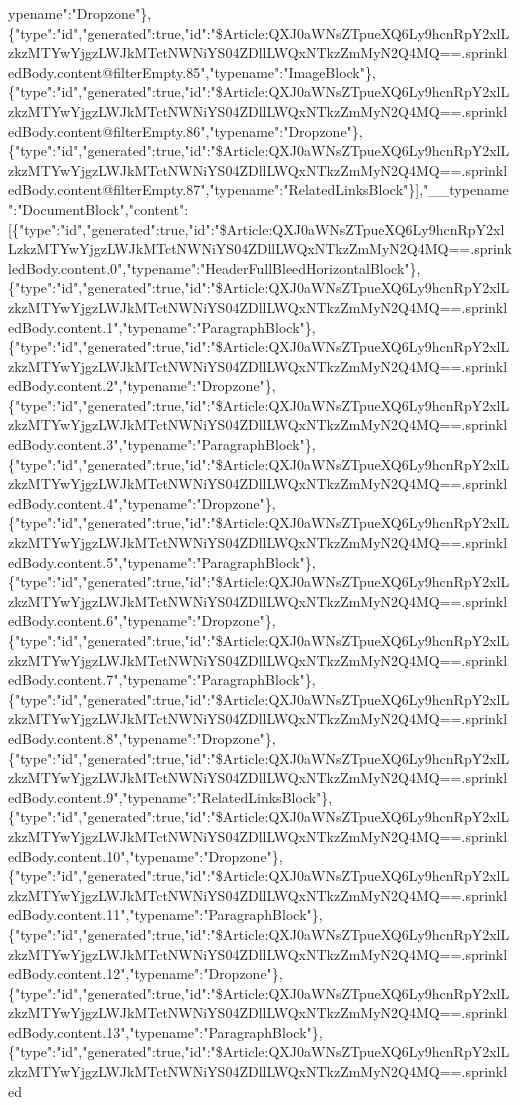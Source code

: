 ypename":"Dropzone"\},\{"type":"id","generated":true,"id":"\$Article:QXJ0aWNsZTpueXQ6Ly9hcnRpY2xlLzkzMTYwYjgzLWJkMTctNWNiYS04ZDllLWQxNTkzZmMyN2Q4MQ==.sprinkledBody.content@filterEmpty.85","typename":"ImageBlock"\},\{"type":"id","generated":true,"id":"\$Article:QXJ0aWNsZTpueXQ6Ly9hcnRpY2xlLzkzMTYwYjgzLWJkMTctNWNiYS04ZDllLWQxNTkzZmMyN2Q4MQ==.sprinkledBody.content@filterEmpty.86","typename":"Dropzone"\},\{"type":"id","generated":true,"id":"\$Article:QXJ0aWNsZTpueXQ6Ly9hcnRpY2xlLzkzMTYwYjgzLWJkMTctNWNiYS04ZDllLWQxNTkzZmMyN2Q4MQ==.sprinkledBody.content@filterEmpty.87","typename":"RelatedLinksBlock"\}{]},"\_\_typename":"DocumentBlock","content":{[}\{"type":"id","generated":true,"id":"\$Article:QXJ0aWNsZTpueXQ6Ly9hcnRpY2xlLzkzMTYwYjgzLWJkMTctNWNiYS04ZDllLWQxNTkzZmMyN2Q4MQ==.sprinkledBody.content.0","typename":"HeaderFullBleedHorizontalBlock"\},\{"type":"id","generated":true,"id":"\$Article:QXJ0aWNsZTpueXQ6Ly9hcnRpY2xlLzkzMTYwYjgzLWJkMTctNWNiYS04ZDllLWQxNTkzZmMyN2Q4MQ==.sprinkledBody.content.1","typename":"ParagraphBlock"\},\{"type":"id","generated":true,"id":"\$Article:QXJ0aWNsZTpueXQ6Ly9hcnRpY2xlLzkzMTYwYjgzLWJkMTctNWNiYS04ZDllLWQxNTkzZmMyN2Q4MQ==.sprinkledBody.content.2","typename":"Dropzone"\},\{"type":"id","generated":true,"id":"\$Article:QXJ0aWNsZTpueXQ6Ly9hcnRpY2xlLzkzMTYwYjgzLWJkMTctNWNiYS04ZDllLWQxNTkzZmMyN2Q4MQ==.sprinkledBody.content.3","typename":"ParagraphBlock"\},\{"type":"id","generated":true,"id":"\$Article:QXJ0aWNsZTpueXQ6Ly9hcnRpY2xlLzkzMTYwYjgzLWJkMTctNWNiYS04ZDllLWQxNTkzZmMyN2Q4MQ==.sprinkledBody.content.4","typename":"Dropzone"\},\{"type":"id","generated":true,"id":"\$Article:QXJ0aWNsZTpueXQ6Ly9hcnRpY2xlLzkzMTYwYjgzLWJkMTctNWNiYS04ZDllLWQxNTkzZmMyN2Q4MQ==.sprinkledBody.content.5","typename":"ParagraphBlock"\},\{"type":"id","generated":true,"id":"\$Article:QXJ0aWNsZTpueXQ6Ly9hcnRpY2xlLzkzMTYwYjgzLWJkMTctNWNiYS04ZDllLWQxNTkzZmMyN2Q4MQ==.sprinkledBody.content.6","typename":"Dropzone"\},\{"type":"id","generated":true,"id":"\$Article:QXJ0aWNsZTpueXQ6Ly9hcnRpY2xlLzkzMTYwYjgzLWJkMTctNWNiYS04ZDllLWQxNTkzZmMyN2Q4MQ==.sprinkledBody.content.7","typename":"ParagraphBlock"\},\{"type":"id","generated":true,"id":"\$Article:QXJ0aWNsZTpueXQ6Ly9hcnRpY2xlLzkzMTYwYjgzLWJkMTctNWNiYS04ZDllLWQxNTkzZmMyN2Q4MQ==.sprinkledBody.content.8","typename":"Dropzone"\},\{"type":"id","generated":true,"id":"\$Article:QXJ0aWNsZTpueXQ6Ly9hcnRpY2xlLzkzMTYwYjgzLWJkMTctNWNiYS04ZDllLWQxNTkzZmMyN2Q4MQ==.sprinkledBody.content.9","typename":"RelatedLinksBlock"\},\{"type":"id","generated":true,"id":"\$Article:QXJ0aWNsZTpueXQ6Ly9hcnRpY2xlLzkzMTYwYjgzLWJkMTctNWNiYS04ZDllLWQxNTkzZmMyN2Q4MQ==.sprinkledBody.content.10","typename":"Dropzone"\},\{"type":"id","generated":true,"id":"\$Article:QXJ0aWNsZTpueXQ6Ly9hcnRpY2xlLzkzMTYwYjgzLWJkMTctNWNiYS04ZDllLWQxNTkzZmMyN2Q4MQ==.sprinkledBody.content.11","typename":"ParagraphBlock"\},\{"type":"id","generated":true,"id":"\$Article:QXJ0aWNsZTpueXQ6Ly9hcnRpY2xlLzkzMTYwYjgzLWJkMTctNWNiYS04ZDllLWQxNTkzZmMyN2Q4MQ==.sprinkledBody.content.12","typename":"Dropzone"\},\{"type":"id","generated":true,"id":"\$Article:QXJ0aWNsZTpueXQ6Ly9hcnRpY2xlLzkzMTYwYjgzLWJkMTctNWNiYS04ZDllLWQxNTkzZmMyN2Q4MQ==.sprinkledBody.content.13","typename":"ParagraphBlock"\},\{"type":"id","generated":true,"id":"\$Article:QXJ0aWNsZTpueXQ6Ly9hcnRpY2xlLzkzMTYwYjgzLWJkMTctNWNiYS04ZDllLWQxNTkzZmMyN2Q4MQ==.sprinkled